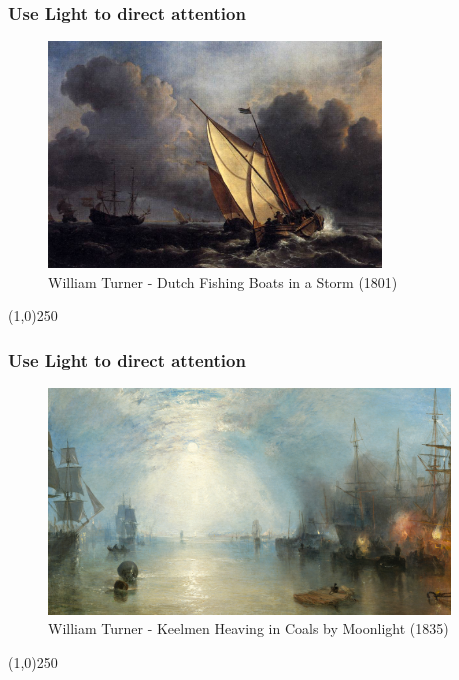 \begin{frame}
\frametitle{Use Light to direct attention}
\begin{figure}
	\centering
		\includegraphics[height=6cm]{img/candc/TurnerFishingBoatsStorm.jpg}
	\caption{William Turner - Dutch Fishing Boats in a Storm (1801)}
	\label{fig:WilliamTurnerFishingBoat}
\end{figure}
\end{frame}
\begin{center}\line(1,0){250}\end{center}



\begin{frame}
\frametitle{Use Light to direct attention}
\begin{figure}
	\centering
		\includegraphics[height=6cm]{img/candc/TurnerCoal-by-Moonlight.jpg}
	\caption{William Turner - Keelmen Heaving in Coals by Moonlight (1835)}
	\label{fig:williamTurnerKeelmen}
\end{figure}
\end{frame}
\begin{center}\line(1,0){250}\end{center}




